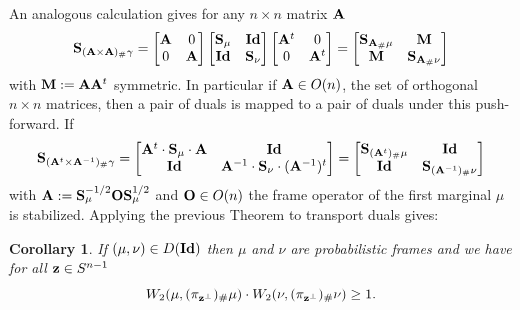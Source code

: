 \documentclass{amsart}
\numberwithin{equation}{section}
\newcommand\bA{{\bf A}}
\newcommand\bM{{\bf M}}
\newcommand\bO{{\bf O}}
\newcommand\bS{{\bf S}}
\newcommand\id{{\operatorname{\bf Id}}}
\theoremstyle{plain}
\newtheorem{corollary}[subsection]{Corollary}
\theoremstyle{definition}
\begin{document}
An analogous calculation gives for any $n\times n$ matrix $\bA$
\[ 
{\bf S}_{(\bA \times \bA)_{\#}\gamma}
=
\begin{bmatrix}
\bA & 0 \\
0 & \bA
\end{bmatrix}
\begin{bmatrix}
\bS_{\mu} & \id \\
\id & \bS_{\nu}
\end{bmatrix}
\begin{bmatrix}
\bA^t & 0 \\
0 & \bA^t
\end{bmatrix}
=
\begin{bmatrix}
\bS_{\bA_{\#}\mu} & \bM \\
\bM  & \bS_{\bA_{\#}\nu}  
\end{bmatrix}
\]
with $\bM :=\bA \bA^t$ symmetric. In particular if $\bA \in {\rm O}(n)$, the set of orthogonal $n\times n$ matrices, then a pair of duals
is mapped to a pair of duals under this push-forward. If  
\[ 
{\bf S}_{(\bA^t \times \bA^{-1})_{\#}\gamma}
=
\begin{bmatrix}
\bA^t \cdot \bS_{\mu}\cdot \bA & \id \\
\id  & \bA^{-1} \cdot \bS_{\nu} \cdot (\bA^{-1})^t 
\end{bmatrix}=
\begin{bmatrix}
\bS_{(\bA^t)_{\#}\mu} & \id \\
\id  & \bS_{(\bA^{-1})_{\#}\nu} 
\end{bmatrix}
\]
with $\bA:=\bS^{-1/2}_{\mu}{\bf O} \bS^{1/2}_{\mu}$ 
and $\bO \in {\rm O}(n)$ the frame operator of the first marginal $\mu$ is stabilized. Applying the previous Theorem to transport duals gives:      
\begin{corollary}\label{frame_off_identity}
If  $(\mu,\nu) \in D(\id)$ then $\mu$ and $\nu$ are probabilistic frames and we have for all ${\bf z} \in S^{n-1}$
\[W_2(\mu, (\pi_{{\bf z}^{\perp}})_{\#}\mu)\cdot W_2(\nu, (\pi_{{\bf z}^{\perp}})_{\#}\nu) \geq 1.  \]
\end{corollary}
\end{document}
